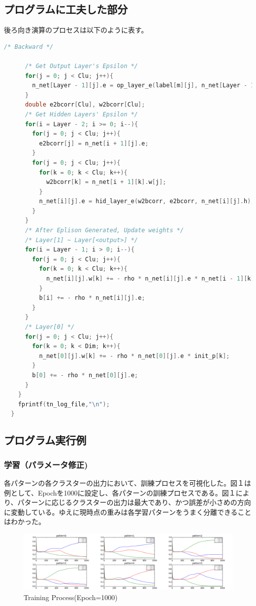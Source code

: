 \documentclass[ %
  uplatex,%
  papersize%
]{jsarticle}
\begin{document}
\subsection{プログラムに工夫した部分}
後ろ向き演算のプロセスは以下のように表す。

\begin{lstlisting}[language=c,caption=Backward Calculation]
     /* Backward */
     
      /* Get Output Layer's Epsilon */
      for(j = 0; j < Clu; j++){
        n_net[Layer - 1][j].e = op_layer_e(label[m][j], n_net[Layer - 1][j].h);
      }
      double e2bcorr[Clu], w2bcorr[Clu];
      /* Get Hidden Layers' Epsilon */
      for(i = Layer - 2; i >= 0; i--){
        for(j = 0; j < Clu; j++){
          e2bcorr[j] = n_net[i + 1][j].e;
        }
        for(j = 0; j < Clu; j++){
          for(k = 0; k < Clu; k++){
            w2bcorr[k] = n_net[i + 1][k].w[j];
          }
          n_net[i][j].e = hid_layer_e(w2bcorr, e2bcorr, n_net[i][j].h);
        }
      }
      /* After Eplison Generated, Update weights */
      /* Layer[1] ~ Layer[<output>] */
      for(i = Layer - 1; i > 0; i--){
        for(j = 0; j < Clu; j++){
          for(k = 0; k < Clu; k++){
            n_net[i][j].w[k] += - rho * n_net[i][j].e * n_net[i - 1][k].h;
          }
          b[i] += - rho * n_net[i][j].e;
        }
      }
      /* Layer[0] */
      for(j = 0; j < Clu; j++){
        for(k = 0; k < Dim; k++){
          n_net[0][j].w[k] += - rho * n_net[0][j].e * init_p[k];
        }
        b[0] += - rho * n_net[0][j].e;
      }
    }
    fprintf(tn_log_file,"\n");
  }
\end{lstlisting}

\subsection{プログラム実行例}
\subsubsection{学習（パラメータ修正)}

各パターンの各クラスターの出力において、訓練プロセスを可視化した。図１は例として、Epochを1000に設定し、各パターンの訓練プロセスである。図１により、パターンに応じるクラスターの出力は最大であり、かつ誤差が小さめの方向に変動している。ゆえに現時点の重みは各学習パターンをうまく分離できることはわかった。

\begin{figure}
\centering
\includegraphics[height=0.25\textwidth]{epoch_1000}
\caption{Training Process(Epoch=1000)} 
\end{figure}
\end{document}
